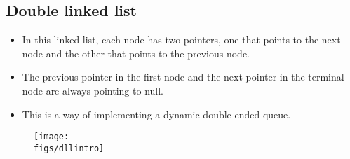 \subsection{Double linked list}
\begin{itemize}
    \item In this linked list, each node has two pointers, one that points to the next node and the other that points to the previous node. 
    \item The previous pointer in the first node and the next pointer in the terminal node are always pointing to null. 
    \item This is a way of implementing a dynamic double ended queue. 
\end{itemize}
\begin{figure}[H]
    \centering
    \texttt{[image: \\figs/dllintro]} 
\end{figure}
